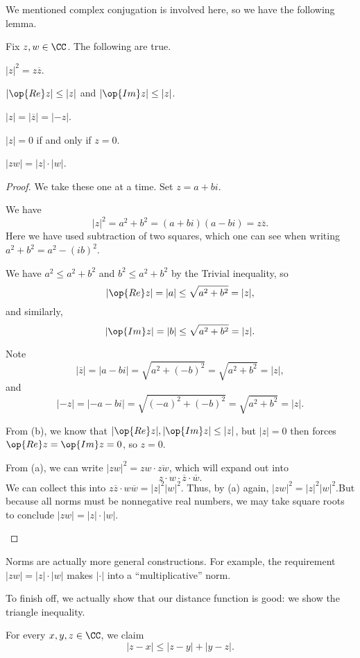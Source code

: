 We mentioned complex conjugation is involved here, so we have the following lemma.
\begin{lemma}
	Fix $z,w\in\CC$. The following are true.
	\begin{listalph}
		\item $|z|^2=z\overline z$.
		\item $|\op{Re}z|\le|z|$ and $|\op{Im}z|\le|z|$.
		\item $|z|=|\overline z|=|-z|$.
		\item $|z|=0$ if and only if $z=0$.
		\item $|zw|=|z|\cdot|w|$.
	\end{listalph}
\end{lemma}
\begin{proof}
	We take these one at a time. Set $z=a+bi$.
	\begin{listalph}
		\item We have
		\[|z|^2=a^2+b^2=(a+bi)(a-bi)=z\overline z.\]
		Here we have used subtraction of two squares, which one can see when writing $a^2+b^2=a^2-(ib)^2$.
		\item We have $a^2\le a^2+b^2$ and $b^2\le a^2+b^2$ by the Trivial inequality, so
		\[|\op{Re}z|=|a|\le\sqrt{a^2+b^2}=|z|,\]
		and similarly,
		\[|\op{Im}z|=|b|\le\sqrt{a^2+b^2}=|z|.\]
		\item Note
		\[|\overline z|=|a-bi|=\sqrt{a^2+(-b)^2}=\sqrt{a^2+b^2}=|z|,\]
		and
		\[|-z|=|-a-bi|=\sqrt{(-a)^2+(-b)^2}=\sqrt{a^2+b^2}=|z|.\]
		\item From (b), we know that $|\op{Re}z|,|\op{Im}z|\le|z|$, but $|z|=0$ then forces $\op{Re}z=\op{Im}z=0$, so $z=0$.
		\item From (a), we can write $|zw|^2=zw\cdot\overline{zw}$, which will expand out into
		\[z\cdot w\cdot\overline z\cdot\overline w.\]
		We can collect this into $z\overline z\cdot w\overline w=|z|^2|w|^2$. Thus, by (a) again, $|zw|^2=|z|^2|w|^2$.But because all norms must be nonnegative real numbers, we may take square roots to conclude $|zw|=|z|\cdot|w|$.
		\qedhere
	\end{listalph}
\end{proof}
\begin{remark}
	Norms are actually more general constructions. For example, the requirement $|zw|=|z|\cdot|w|$ makes $|\cdot|$ into a ``multiplicative'' norm.
\end{remark}
To finish off, we actually show that our distance function is good: we show the triangle inequality.
\begin{lemma}
	For every $x,y,z\in\CC$, we claim
	\[|z-x|\le|z-y|+|y-z|.\]
\end{lemma}
